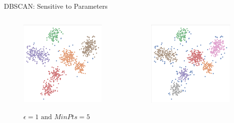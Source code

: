 \begin{frame}{DBSCAN: Sensitive to Parameters}
	\centering
	\begin{columns}[c]
		\begin{column}{0.5\textwidth}
			\begin{figure}
				\centering
				\includegraphics[width=0.75\textheight, trim={1mm 1mm 1mm 1mm}, clip]{img/dbscan-eps-1-minpts-5.png}

				\textbf{\small $\epsilon = 1 \text{ and } MinPts=5$}
			\end{figure}
		\end{column}
		\begin{column}{0.5\textwidth}
			\begin{figure}
				\centering
				\includegraphics[width=0.75\textheight, trim={1mm 1mm 1mm 1mm}, clip]{img/dbscan-eps-0.7-minpts-10.png}


\end{figure}
\end{column}
\end{columns}
\end{frame}
